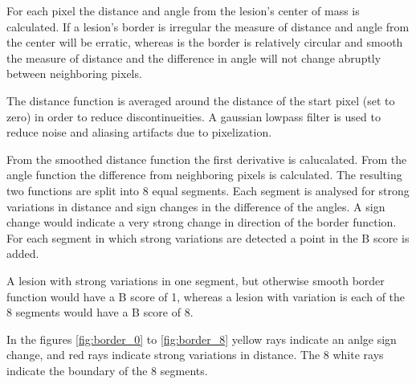 For each pixel the distance and angle from the lesion's center of mass is calculated. If a lesion's border is irregular the measure of distance and angle from the center will be erratic, whereas is the border is relatively circular and smooth the measure of distance and the difference in angle will not change abruptly between neighboring pixels.

The distance function is averaged around the distance of the start pixel (set to zero) in order to reduce discontinueities. A gaussian lowpass filter is used to reduce noise and aliasing artifacts due to pixelization.

From the smoothed distance function the first derivative is calucalated. From the angle function the difference from neighboring pixels is calculated. The resulting two functions are split into 8 equal segments. Each segment is analysed for strong variations in distance and sign changes in the difference of the angles. A sign change would indicate a very strong change in direction of the border function. For each segment in which strong variations are detected a point in the B score is added.

A lesion with strong variations in one segment, but otherwise smooth border function would have a B score of 1, whereas a lesion with variation is each of the 8 segments would have a B score of 8.

In the figures \ref{fig:border_0} to \ref{fig:border_8} yellow rays indicate an anlge sign change, and red rays indicate strong variations in distance. The 8 white rays indicate the boundary of the 8 segments.

